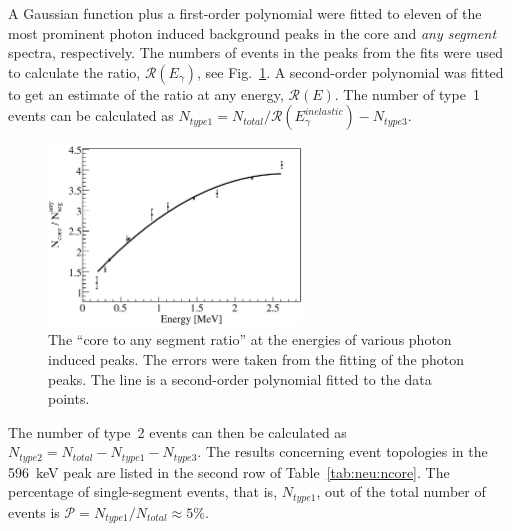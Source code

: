 A Gaussian function plus a first-order polynomial were fitted to eleven of the most prominent photon induced background peaks in the core and \emph{any segment} spectra, respectively. The numbers of events in the peaks from the fits were used to calculate the ratio, $\mathcal{R}(E_{\gamma})$, see Fig.~\ref{fig:neu:sf}. A second-order polynomial was fitted to get an estimate of the ratio at any energy, $\mathcal{R}(E)$. The number of type~1 events can be calculated as $N_{type1} = N_{total} / \mathcal{R}(E_{\gamma}^{inelastic}) - N_{type3}$.

\begin{figure}[tbhp]
\centering
\includegraphics[width=0.6\textwidth,clip]{sf}
\caption{The ``core to any segment ratio'' at the energies of various photon induced peaks. The errors were taken from the fitting of the photon peaks. The line is a second-order polynomial fitted to the data points.}
\label{fig:neu:sf}
\end{figure}

The number of type~2 events can then be calculated as $N_{type2} = N_{total} - N_{type1} - N_{type3}$. The results concerning event topologies in the 596~keV peak are listed in the second row of Table~\ref{tab:neu:ncore}. The percentage of single-segment events, that is, $N_{type1}$, out of the total number of events is $\mathcal{P} = N_{type1} / N_{total} \approx 5\%$.

